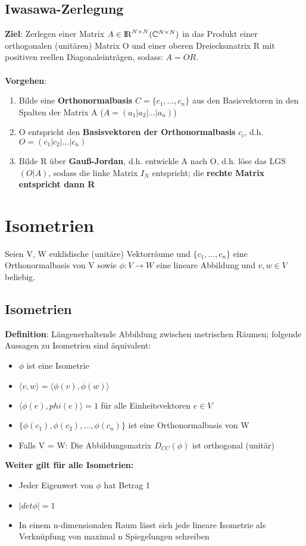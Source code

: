 \documentclass[10pt,a4paper]{article}
\def\realnumbers{{\rm I\!R}}
\def\complexnumbers{{\mathbb{C}}}
\begin{document}
	\subsection{Iwasawa-Zerlegung}
	\textbf{Ziel}: Zerlegen einer Matrix $A \in \realnumbers^{N\times N} (\complexnumbers^{N\times N})$ in das Produkt einer orthogonalen (unitären) Matrix O und einer oberen Dreiecksmatrix R mit positiven reellen Diagonaleinträgen, sodass: $A = OR$.\\\\
	\textbf{Vorgehen}:
	\begin{enumerate}
		\item Bilde eine \textbf{Orthonormalbasis} $C = \{c_1, ..., c_n\}$ aus den Basisvektoren in den Spalten der Matrix A ($A = (a_1 | a_2 | ... | a_n)$)
		\item O entspricht den \textbf{Basisvektoren der Orthonormalbasis} $c_i$, d.h. $O = (c_1 | c_2 | ... | c_n)$
		\item Bilde R über \textbf{Gauß-Jordan}, d.h. entwickle A nach O, d.h. löse das LGS $(O | A)$, sodass die linke Matrix $I_N$ entspricht; die \textbf{rechte Matrix entspricht dann R}
	\end{enumerate}
	\section{Isometrien}
	Seien V, W euklidische (unitäre) Vektorräume und $\{c_1, ..., c_n\}$ eine Orthonormalbasis von V sowie $\phi: V \rightarrow W$ eine lineare Abbildung und $v, w \in V$ beliebig.
	
	\subsection{Isometrien}
	\textbf{Definition}: Längenerhaltende Abbildung zwischen metrischen Räumen; folgende Aussagen zu Isometrien sind äquivalent:
	\begin{itemize}
		\item $\phi$ ist eine Isometrie
		\item $\langle v, w\rangle = \langle \phi(v), \phi(w)\rangle$
		\item $\langle \phi(e), phi(e)\rangle = 1$ für alle Einheitsvektoren $e \in V$
		\item $\{\phi(c_1), \phi(c_2), ..., \phi(c_n)\}$ ist eine Orthonormalbasis von W
		\item Falls V = W: Die Abbildungsmatrix $D_{CC}(\phi)$ ist orthogonal (unitär)
	\end{itemize}
	\textbf{Weiter gilt für alle Isometrien:}
	\begin{itemize}
		\item Jeder Eigenwert von $\phi$ hat Betrag 1
		\item $|det \phi| = 1$
		\item In einem n-dimensionalen Raum lässt sich jede lineare Isometrie als Verknüpfung von maximal n Spiegelungen schreiben
	\end{itemize}
\end{document}
